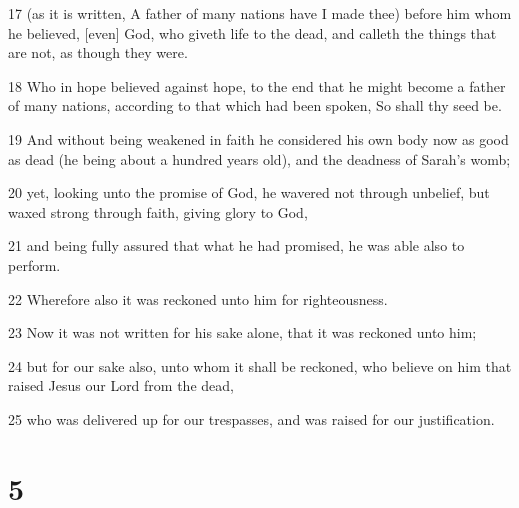 \par 17 (as it is written, A father of many nations have I made thee) before him whom he believed, [even] God, who giveth life to the dead, and calleth the things that are not, as though they were.
\par 18 Who in hope believed against hope, to the end that he might become a father of many nations, according to that which had been spoken, So shall thy seed be.
\par 19 And without being weakened in faith he considered his own body now as good as dead (he being about a hundred years old), and the deadness of Sarah's womb;
\par 20 yet, looking unto the promise of God, he wavered not through unbelief, but waxed strong through faith, giving glory to God,
\par 21 and being fully assured that what he had promised, he was able also to perform.
\par 22 Wherefore also it was reckoned unto him for righteousness.
\par 23 Now it was not written for his sake alone, that it was reckoned unto him;
\par 24 but for our sake also, unto whom it shall be reckoned, who believe on him that raised Jesus our Lord from the dead,
\par 25 who was delivered up for our trespasses, and was raised for our justification.

\chapter{5}

